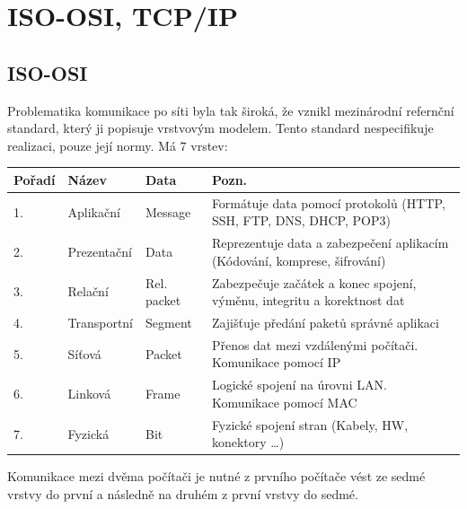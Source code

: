 \section{ISO-OSI, TCP/IP}
\label{sec:isoosi}
\subsection{ISO-OSI}
Problematika komunikace po síti byla tak široká, že vznikl mezinárodní refernční standard, který ji popisuje vrstvovým modelem.
Tento standard nespecifikuje realizaci, pouze její normy.
Má 7 vrstev: \\
\begin{tabularx}{\linewidth}{l|l|l|l}
  \textbf{Pořadí} & \textbf{Název} & \textbf{Data} & \textbf{Pozn.}                                                            \\
  \hline
  1.              & Aplikační      & Message       & Formátuje data pomocí protokolů (HTTP, SSH, FTP, DNS, DHCP, POP3)         \\
  \hline
  2.              & Prezentační    & Data          & Reprezentuje data a zabezpečení aplikacím (Kódování, komprese, šifrování) \\
  \hline
  3.              & Relační        & Rel. packet   & Zabezpečuje začátek a konec spojení, výměnu, integritu a korektnost dat   \\
  \hline
  4.              & Transportní    & Segment       & Zajišťuje předání paketů správné aplikaci                                 \\
  \hline
  5.              & Síťová         & Packet        & Přenos dat mezi vzdálenými počítači. Komunikace pomocí IP                 \\
  \hline
  6.              & Linková        & Frame         & Logické spojení na úrovni LAN. Komunikace pomocí MAC                      \\
  \hline
  7.              & Fyzická        & Bit           & Fyzické spojení stran (Kabely, HW, konektory \dots)                       \\
\end{tabularx}
Komunikace mezi dvěma počítači je nutné z prvního počítače vést ze sedmé vrstvy do první a následně na druhém z první vrstvy do sedmé.
